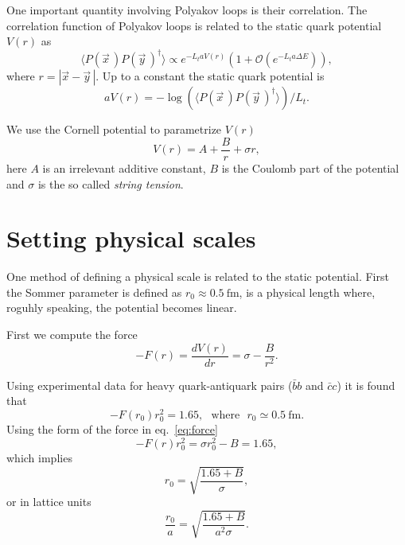 \documentclass[12pt,a4paper]{article}
\begin{document}
One important quantity involving Polyakov loops is their correlation. The correlation function of Polyakov loops is related to the static quark potential $V(r)$ as
\begin{equation}
	\langle P(\vec{x}\,) P(\vec{y}\,)^{\dagger} \rangle \propto e^{-L_t a V(r)} \left(1 +\mathcal{O}\left( e^{-L_t a \Delta E}\right) \right),
\end{equation}
where $r = |\vec{x} - \vec{y}\,|$. Up to a constant the static quark potential is
\begin{equation}
	aV(r) = - \log(\langle P(\vec{x}\,) P(\vec{y}\,)^{\dagger} \rangle)/L_t.
\end{equation}

We use the Cornell potential to parametrize $V(r)$
\begin{equation}
	V(r) = A + \frac{B}{r} + \sigma r,
\end{equation}
here $A$ is an irrelevant additive constant, $B$ is the Coulomb part of the potential and $\sigma$ is the so called \textit{string tension}.

\section{Setting physical scales}
One method of defining a physical scale is related to the static potential. First the Sommer parameter is defined as $r_0 \approx 0.5 \ \text{fm}$, is a physical length where, roguhly speaking, the potential becomes linear.

First we compute the force 
\begin{equation}
	\label{eq:force}
	-F(r) = \frac{dV(r)}{dr} = \sigma - \frac{B}{r^2}.
\end{equation}

Using experimental data for heavy quark-antiquark pairs ($\bar{b}b$ and $\bar{c}c$) it is found that 
\begin{equation}
	-F(r_0)r_0^2 = 1.65, \ \ \ \text{where} \ \ \ r_0 \simeq 0.5 \ \text{fm}.
\end{equation}
Using the form of the force in eq.\ \eqref{eq:force} 
	\begin{equation}
		-F(r)r_0^2 = \sigma r_0^2 - B = 1.65,
	\end{equation}
which implies
	\begin{equation}
		r_0 = \sqrt{\frac{1.65+B}{\sigma}},
	\end{equation}
or in lattice units
	\begin{equation}
		\frac{r_0}{a} = \sqrt{\frac{1.65+B}{a^2\sigma}}.
	\end{equation}
\end{document}
